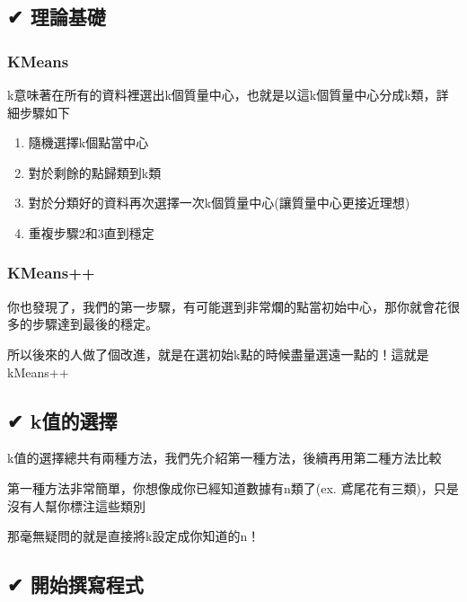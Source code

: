 \documentclass[11pt]{ctexart}
\begin{document}
\hypertarget{ux7406ux8ad6ux57faux790e}{%
\subsection{✔ 理論基礎}\label{ux7406ux8ad6ux57faux790e}}

\hypertarget{kmeans}{%
\subsubsection{KMeans}\label{kmeans}}

k意味著在所有的資料裡選出k個質量中心，也就是以這k個質量中心分成k類，詳細步驟如下

\begin{enumerate}
\def\labelenumi{\arabic{enumi}.}
\item
  隨機選擇k個點當中心
\item
  對於剩餘的點歸類到k類
\item
  對於分類好的資料再次選擇一次k個質量中心(讓質量中心更接近理想)
\item
  重複步驟2和3直到穩定
\end{enumerate}

\hypertarget{kmeans-1}{%
\subsubsection{KMeans++}\label{kmeans-1}}

你也發現了，我們的第一步驟，有可能選到非常爛的點當初始中心，那你就會花很多的步驟達到最後的穩定。

所以後來的人做了個改進，就是在選初始k點的時候盡量選遠一點的！這就是kMeans++

\hypertarget{kux503cux7684ux9078ux64c7}{%
\subsection{✔ k值的選擇}\label{kux503cux7684ux9078ux64c7}}

k值的選擇總共有兩種方法，我們先介紹第一種方法，後續再用第二種方法比較

第一種方法非常簡單，你想像成你已經知道數據有n類了(ex.
鳶尾花有三類)，只是沒有人幫你標注這些類別

那毫無疑問的就是直接將k設定成你知道的n！

    \hypertarget{ux958bux59cbux64b0ux5bebux7a0bux5f0f}{%
\subsection{✔ 開始撰寫程式}\label{ux958bux59cbux64b0ux5bebux7a0bux5f0f}}
\end{document}
